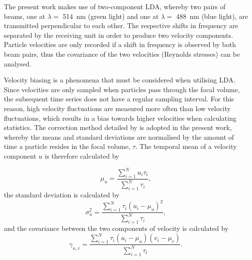 \documentclass[12pt,oneside,a4paper]{article}
\begin{document}
The present work makes use of two-component LDA, whereby two pairs of beams, one at $\lambda = $ \SI{514}{nm} (green light) and one at $\lambda = $ \SI{488}{nm} (blue light), are transmitted perpendicular to each other. The respective shifts in frequency are separated by the receiving unit in order to produce two velocity components. Particle velocities are only recorded if a shift in frequency is observed by both beam pairs, thus the covariance of the two velocities (Reynolds stresses) can be analysed. 

Velocity biasing is a phenomena that must be considered when utilising LDA. Since velocities are only sampled when particles pass through the focal volume, the subsequent time series does not have a regular sampling interval. For this reason, high velocity fluctuations are measured more often than low velocity fluctuations, which results in a bias towards higher velocities when calculating statistics. The correction method detailed by \cite{zhang2010lda} is adopted in the present work, whereby the means and standard deviations are normalised by the amount of time a particle resides in the focal volume, $\tau$. The temporal mean of a velocity component $u$ is therefore calculated by

\begin{equation}
\mu_u = \frac{\sum^N_{i=1} u_i \tau_i}{\sum^N_{i=1} \tau_i}, 
\end{equation}
the standard deviation is calculated by
\begin{equation}
\sigma_u^2 = \frac{\sum^N_{i=1} \tau_i (u_i - \mu_u)^2}{\sum^N_{i=1} \tau_i},
\end{equation}
and the covariance between the two components of velocity is calculated by
\begin{equation}
\gamma_{u,v} = \frac{\sum^N_{i=1} \tau_i (u_i - \mu_u)(v_i - \mu_v)}{\sum^N_{i=1} \tau_i}.
\end{equation}
\end{document}
